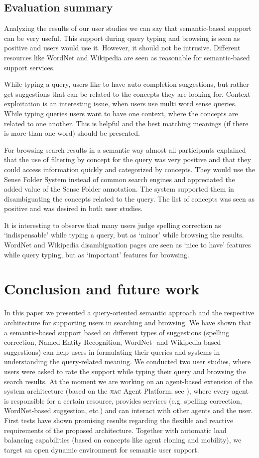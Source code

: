 \documentclass[output=paper]{LSP/langsci}
\begin{document}
\subsection{Evaluation summary}
Analyzing the results of our user studies we can say that semantic-based support can be very useful. 
This support during query typing and browsing is seen as positive and users would use it. However, it should not be intrusive. Different resources like WordNet and Wikipedia are seen as reasonable for semantic-based support services.\par 
While typing a query, users like to have auto completion suggestions, but rather get suggestions that can be related to the concepts they are looking for. Context exploitation is an interesting issue, when users use multi word sense queries. While typing queries users want to have one context, where the concepts are related to one another.  
This is helpful and the best matching meanings (if there is more than one word) should be presented. \par
For browsing search results in a semantic way almost all participants explained that the use of filtering by concept for the query was very positive and that they could access information quickly and categorized by concepts. They would use the Sense Folder System instead of common search engines and appreciated the added value of the Sense Folder annotation. The system supported them in disambiguating the concepts related to the query. The list of concepts was seen as positive and was desired in both user studies. \par
It is interesting to observe that many users judge spelling correction as `indispensable' while typing a query, 
but as `minor' while browsing the results. 
WordNet and Wikipedia disambiguation pages are seen as `nice to have' features
while query typing, but as `important' features for browsing.


\section{Conclusion and future work}
In this paper we presented a query-oriented semantic approach and the respective
architecture for supporting users in searching and browsing. We have shown that
a semantic-based support based on different types of suggestions (spelling
correction, Named-Entity Recognition, WordNet- and Wikipedia-based suggestions)
can help users in formulating their queries and systems in understanding the
query-related meaning. We conducted two user studies, where users were asked
to rate the support while typing their query and browsing the search results.
At the moment we are working on an agent-based extension of the system
architecture (based on the \textsc{jiac} Agent Platform, see \citealt{Hirsch2009Multi-Agent}),
where every agent is responsible for a certain resource, provides services
(e.g. spelling correction, WordNet-based suggestion, etc.) and can interact with
other agents and the user. First tests have shown promising results regarding the
flexible and reactive requirements of the proposed architecture. Together with
automatic load balancing capabilities (based on concepts like agent cloning and
mobility), we target an open dynamic environment for semantic user support.

\sloppy
\printbibliography[heading=subbibliography,notkeyword=this]
\end{document}
